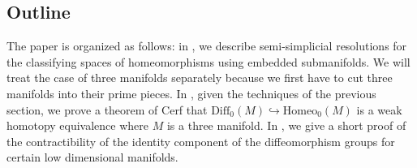 \documentclass[a4paper]{amsart}
\theoremstyle{definition}
\theoremstyle{remark}
\newcommand\Diff{\mathrm{Diff}}
\newcommand\Homeo{\mathrm{Homeo}}
\newcommand{\hcoker}{/\!\!/}
\newcommand{\tH}{\text{\textnormal{Homeo}}}
\newcommand{\BH}{\mathrm{B}\text{\textnormal{Homeo}}}
\newcommand{\tdH}{\text{Homeo}^{\delta}}
\newcommand{\BdH}{\mathrm{B}\text{\textnormal{Homeo}}^{\delta}}
\numberwithin{equation}{section}
\begin{document}
\subsection{Outline} The paper is organized as follows: in , we describe semi-simplicial resolutions for the classifying spaces of homeomorphisms using embedded submanifolds. We will treat the case of three manifolds separately because we first have to cut three manifolds into their prime pieces. In , given the techniques of the previous section, we prove a theorem of Cerf that $\Diff_0(M)\hookrightarrow \Homeo_0(M)$  is a weak homotopy equivalence where $M$ is a three manifold. In , we give a short proof of the contractibility of the identity component of the diffeomorphism groups for certain low dimensional manifolds.
\end{document}
